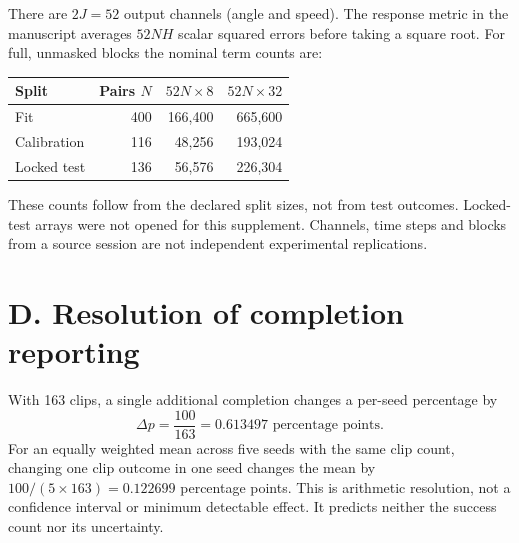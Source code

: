 \documentclass[letterpaper,10pt,conference]{ieeeconf}
\begin{document}
There are $2J=52$ output channels (angle and speed). The response metric in the manuscript averages $52NH$ scalar squared errors before taking a square root. For full, unmasked blocks the nominal term counts are:

\begin{center}
\small
\begin{tabular}{@{}lrrr@{}}
\toprule
Split & Pairs $N$ & $52N\times8$ & $52N\times32$ \\
\midrule
Fit & 400 & 166,400 & 665,600 \\
Calibration & 116 & 48,256 & 193,024 \\
Locked test & 136 & 56,576 & 226,304 \\
\bottomrule
\end{tabular}
\end{center}

These counts follow from the declared split sizes, not from test outcomes. Locked-test arrays were not opened for this supplement. Channels, time steps and blocks from a source session are not independent experimental replications.

\section*{D. Resolution of completion reporting}
With 163 clips, a single additional completion changes a per-seed percentage by
\begin{equation}
 \Delta p=\frac{100}{163}=0.613497\text{ percentage points}.
\end{equation}
For an equally weighted mean across five seeds with the same clip count, changing one clip outcome in one seed changes the mean by $100/(5\times163)=0.122699$ percentage points. This is arithmetic resolution, not a confidence interval or minimum detectable effect. It predicts neither the success count nor its uncertainty.

\clearpage
{}
\end{document}
